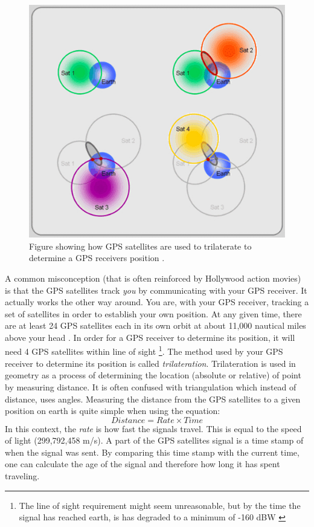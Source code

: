 \documentclass[12pt,english,a4paper]{article}
\begin{document}
\begin{figure}[hb]
  \centering
  \includegraphics[scale=0.4]{trilaterate.jpg}
  \caption[GPS trilaterate figure]
   {Figure showing how GPS satellites are used to trilaterate to determine a GPS receivers position \cite{GISTRILATERATE}.}
\end{figure}

A common misconception (that is often reinforced by Hollywood action movies) is that the GPS satellites track \textit{you} by communicating with your GPS receiver. It actually works the other way around. You are, with your GPS receiver, tracking a set of satellites in order to establish your own position. At any given time, there are at least 24 GPS satellites each in its own orbit at about 11,000 nautical miles above your head \cite{GPSGOVSS}. In order for a GPS receiver to determine its position, it will need 4 GPS satellites within line of sight \footnote{The line of sight requirement might seem unreasonable, but by the time the signal has reached earth, is has degraded to a minimum of -160 dBW \cite{NATINT}}.
The method used by your GPS receiver to determine its position is called \textit{trilateration}. 
Trilateration is used in geometry as a process of determining the location (absolute or relative) of point by measuring distance. It is often confused with triangulation which instead of distance, uses angles. Measuring the distance from the GPS satellites to a given position on earth is quite simple when using the equation: \begin{equation} Distance = Rate \times Time \end{equation} In this context, the \textit{rate} is how fast the signals travel. This is equal to the speed of light (299,792,458 m/s). A part of the GPS satellites signal is a time stamp of when the signal was sent. By comparing this time stamp with the current time, one can calculate the age of the signal and therefore how long it has spent traveling. 
\end{document}
